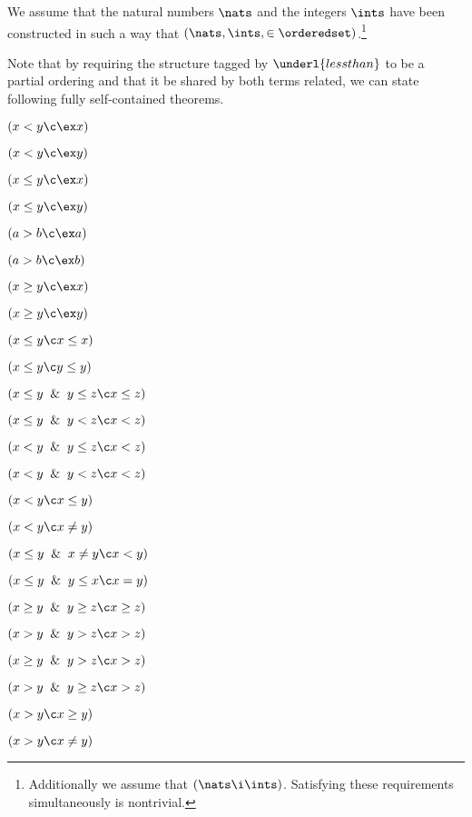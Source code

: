 
We assume that the natural numbers $\nats$ and the
integers $\ints$ have been constructed
in such a way that $(\nats,\ints,\in\orderedset)$.\footnote*{Additionally
we assume that $(\nats\i\ints)$. Satisfying these requirements
simultaneously is nontrivial.} 

\lineb

Note that by requiring the structure tagged by $\underl{lessthan}$
to be a partial ordering and that it be shared by both terms
related, we can state following fully self-contained
theorems.
	\lineb



 $(x < y \c \ex x)$

 $(x < y \c \ex y)$

 $(x \le y \c \ex x)$

 $(x \le y \c \ex y)$

 $(a > b \c \ex a)$

 $(a > b \c \ex b)$

 $(x \ge y \c \ex x)$

 $(x \ge y \c \ex y)$

 $(x \le y \c x \le x )$

 $(x \le y \c y \le y )$

 $(x \le y \And y \le z \c x \le z)$

 $(x \le y \And y < z \c x < z)$

 $(x < y \And y \le z \c x < z)$

 $(x < y \And y < z \c x < z)$

 $(x < y \c x \le y)$

 $(x < y \c x \ne y)$

 $(x \le y \And x \ne y \c x < y)$

 $(x \le y \And y \le x \c x = y)$

 $(x \ge y \And y \ge z \c x \ge z)$

 $(x > y \And y > z \c x > z)$

 $(x \ge y \And y > z \c x > z)$

 $(x > y \And y \ge z \c x > z)$

 $(x > y \c x \ge y)$

 $(x > y \c x \ne y)$


